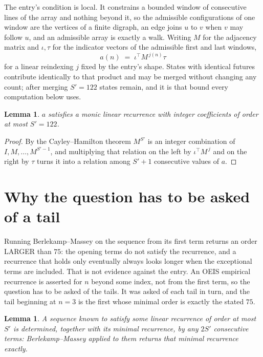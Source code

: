 \documentclass[11pt,a4paper]{article}
\theoremstyle{plain}
\newtheorem{lemma}[theorem]{Lemma}
\theoremstyle{definition}
\begin{document}
The entry's condition is local. It constrains a bounded window of consecutive lines of the
array and nothing beyond it, so the admissible configurations of one window are the vertices of
a finite digraph, an edge joins $u$ to $v$ when $v$ may follow $u$, and an admissible array is
exactly a walk. Writing $M$ for the adjacency matrix and $\iota,\tau$ for the indicator vectors
of the admissible first and last windows,
\[
a(n)\;=\;\iota^{\!\top}M^{\,j(n)}\tau
\]
for a linear reindexing $j$ fixed by the entry's shape. States with identical futures
contribute identically to that product and may be merged without changing any count; after
merging $S'=122$ states remain, and it is that bound every computation below uses.

\begin{lemma}\label{lem:cf}
$a$ satisfies a monic linear recurrence with integer coefficients of order at most $S'=122$.
\end{lemma}

\begin{proof}
By the Cayley--Hamilton theorem $M^{S'}$ is an integer combination of $I,M,\dots,M^{S'-1}$,
and multiplying that relation on the left by $\iota^{\!\top}M^{\,j}$ and on the right by
$\tau$ turns it into a relation among $S'+1$ consecutive values of $a$.
\end{proof}

\section{Why the question has to be asked of a tail}

Running Berlekamp--Massey on the sequence from its first term returns an order LARGER than $75$: the opening terms do not satisfy the recurrence, and a recurrence that holds only eventually always looks longer when the exceptional terms are included. That is not evidence against the entry. An OEIS empirical recurrence is asserted for $n$ beyond some index, not from the first term, so the question has to be asked of the tails. It was asked of each tail in turn, and the tail beginning at $n=3$ is the first whose minimal order is exactly the stated $75$.

\begin{lemma}\label{lem:bm}
A sequence known to satisfy some linear recurrence of order at most $S'$ is determined,
together with its minimal recurrence, by any $2S'$ consecutive terms: Berlekamp--Massey applied
to them returns that minimal recurrence exactly.
\end{lemma}
\end{document}
